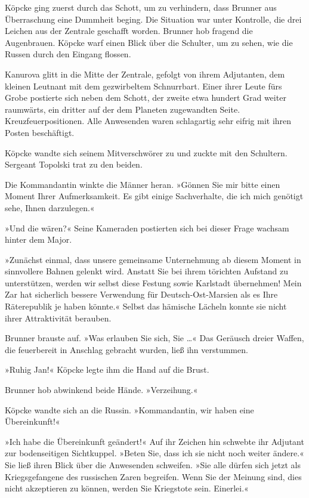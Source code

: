 Köpcke ging zuerst durch das Schott, um zu verhindern, dass Brunner
aus Überraschung eine Dummheit beging. Die Situation war unter
Kontrolle, die drei Leichen aus der Zentrale geschafft worden.
Brunner hob fragend die Augenbrauen. Köpcke warf einen Blick über
die Schulter, um zu sehen, wie die Russen durch den Eingang
flossen.

Kanurova glitt in die Mitte der Zentrale, gefolgt von ihrem
Adjutanten, dem kleinen Leutnant mit dem gezwirbeltem Schnurrbart.
Einer ihrer Leute fürs Grobe postierte sich neben dem Schott, der
zweite etwa hundert Grad weiter raumwärts, ein dritter auf der dem
Planeten zugewandten Seite. Kreuzfeuerpositionen. Alle Anwesenden
waren schlagartig sehr eifrig mit ihren Posten beschäftigt.

Köpcke wandte sich seinem Mitverschwörer zu und zuckte mit den
Schultern. Sergeant Topolski trat zu den beiden.

Die Kommandantin winkte die Männer heran. »Gönnen Sie mir bitte
einen Moment Ihrer Aufmerksamkeit. Es gibt einige Sachverhalte, die
ich mich genötigt sehe, Ihnen darzulegen.«

»Und die wären?« Seine Kameraden postierten sich bei dieser Frage
wachsam hinter dem Major.

»Zunächst einmal, dass unsere gemeinsame Unternehmung ab diesem
Moment in sinnvollere Bahnen gelenkt wird. Anstatt Sie bei ihrem
törichten Aufstand zu unterstützen, werden wir selbst diese Festung
sowie Karlstadt übernehmen! Mein Zar hat sicherlich bessere
Verwendung für Deutsch-Ost-Marsien als es Ihre Räterepublik je
haben könnte.« Selbst das hämische Lächeln konnte sie nicht ihrer
Attraktivität berauben.

Brunner brauste auf. »Was erlauben Sie sich, Sie …« Das Geräusch
dreier Waffen, die feuerbereit in Anschlag gebracht wurden, ließ
ihn verstummen.

»Ruhig Jan!« Köpcke legte ihm die Hand auf die Brust.

Brunner hob abwinkend beide Hände. »Verzeihung.«

Köpcke wandte sich an die Russin. »Kommandantin, wir haben eine
Übereinkunft!«

»Ich habe die Übereinkunft geändert!« Auf ihr Zeichen hin schwebte
ihr Adjutant zur bodenseitigen Sichtkuppel. »Beten Sie, dass ich
sie nicht noch weiter ändere.« Sie ließ ihren Blick über die
Anwesenden schweifen. »Sie alle dürfen sich jetzt als
Kriegsgefangene des russischen Zaren begreifen. Wenn Sie der
Meinung sind, dies nicht akzeptieren zu können, werden Sie
Kriegstote sein. Einerlei.«

